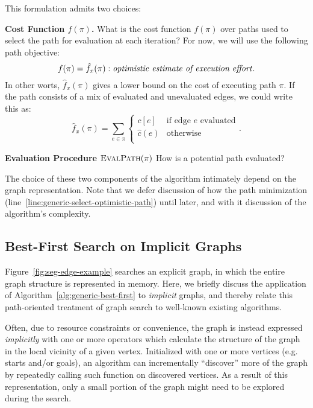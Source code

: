 This formulation admits two choices:

\textbf{Cost Function $f(\pi)$.}
What is the cost function $f(\pi)$ over paths used to select the
path for evaluation at each iteration?
For now, we will use the following path objective:
\begin{equation}
   f(\pi) = \hat{f}_x(\pi): \mbox{\emph{optimistic estimate of execution effort}}.
\end{equation}
In other worts, $\hat{f}_x(\pi)$
gives a lower bound on the cost of executing
path $\pi$.
If the path consists of a mix of evaluated and unevaluated edges,
we could write this as:
\begin{equation}
   \hat{f}_x(\pi) = \sum_{e \in \pi} \left\{
   \begin{array}{cl}
      c[e] & \mbox{if edge } e \mbox{ evaluated}  \\
      \hat{c}(e) & \mbox{otherwise} \\
   \end{array}
   \right.
   .
   \label{eqn:execution-cost-objective}
\end{equation}

\textbf{Evaluation Procedure $\mbox{\sc EvalPath}(\pi)$}
How is a potential path evaluated?

The choice of these two components of the algorithm
intimately depend on the graph representation.
Note that we defer discussion of how the path minimization
(line~\ref{line:generic-select-optimistic-path}) until later,
and with it discussion of the algorithm's complexity.

\subsection{Best-First Search on Implicit Graphs}
\label{sec:implicit}

Figure~\ref{fig:seg-edge-example} searches an explicit graph,
in which the entire graph structure is represented in memory.
Here, we briefly discuss the application of
Algorithm~\ref{alg:generic-best-first}
to \emph{implicit} graphs,
and thereby relate this path-oriented treatment of graph search
to well-known existing algorithms.

Often, due to resource constraints or convenience,
the graph is instead expressed \emph{implicitly}
with one or more operators which calculate the structure of the graph
in the local vicinity of a given vertex.
Initialized with one or more vertices (e.g. starts and/or goals),
an algorithm can incrementally ``discover'' more of the
graph by repeatedly calling such function on discovered vertices.
As a result of this representation,
only a small portion of the graph might need to be explored
during the search.

